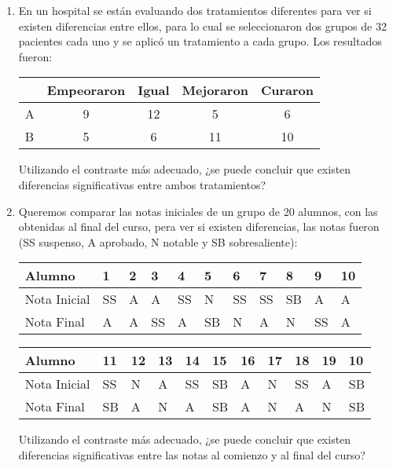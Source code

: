 {{{{{\begin{enumerate}[leftmargin=*]
\item En un hospital se están evaluando dos tratamientos diferentes para ver si existen diferencias entre ellos, para lo
cual se seleccionaron dos grupos de 32 pacientes cada uno y se aplicó un tratamiento a cada grupo.
Los resultados fueron:
\begin{center}
\begin{tabular}{|l|c|c|c|c|}
\cline{2-5}
\multicolumn{1}{c|}{} & Empeoraron & Igual & Mejoraron & Curaron\\
\hline
A & 9 & 12 & 5 & 6 \\
\hline
B & 5 & 6 & 11 & 10 \\
\hline
\end{tabular}
\end{center}

Utilizando el contraste más adecuado, ¿se puede concluir que existen diferencias significativas entre ambos
tratamientos?


\item Queremos comparar las notas iniciales de un grupo de 20 alumnos, con las obtenidas al final del curso, pera ver si
existen diferencias, las notas fueron (SS suspenso, A aprobado, N notable y SB sobresaliente):
\begin{center}
\begin{tabular}{|l|l|l|l|l|l|l|l|l|l|l|}
\hline
 Alumno & 1 & 2 & 3 & 4 & 5 & 6 & 7 & 8 & 9 & 10 \\
\hline
Nota Inicial & SS & A & A & SS & N & SS & SS & SB & A & A  \\
\hline
Nota Final & A & A & SS & A & SB & N & A & N & SS & A  \\
\hline
\end{tabular}
\end{center}

\begin{center}
\begin{tabular}{|l|l|l|l|l|l|l|l|l|l|l|}
\hline
 Alumno & 11 & 12 & 13 & 14 & 15 & 16 & 17 & 18 & 19 & 10 \\
\hline
Nota Inicial & SS & N & A & SS & SB & A & N & SS & A & SB  \\
\hline
Nota Final & SB & A & N & A & SB & A & N & A & N & SB  \\
\hline
\end{tabular}
\end{center}

Utilizando el contraste más adecuado, ¿se puede concluir que existen diferencias significativas entre las notas al
comienzo y al final del curso?



\end{enumerate}}}}}}
